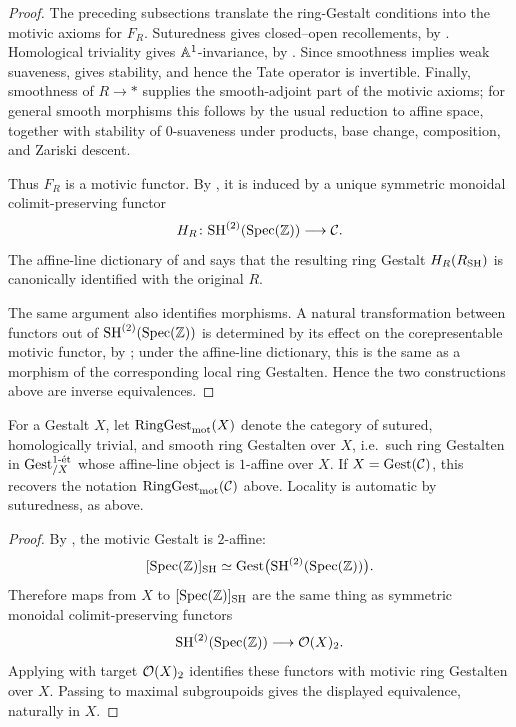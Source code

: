 \documentclass[11pt]{book}
\begin{document}
\begin{proof}
		The preceding subsections translate the ring-Gestalt conditions into the motivic axioms for $F_R$. Suturedness gives closed--open recollements, by . Homological triviality gives $\bbA^1$-invariance, by . Since smoothness implies weak suaveness,  gives stability, and hence the Tate operator is invertible. Finally, smoothness of $R\to*$ supplies the smooth-adjoint part of the motivic axioms; for general smooth morphisms this follows by the usual reduction to affine space, together with stability of \(0\)-suaveness under products, base change, composition, and Zariski descent.

		Thus $F_R$ is a motivic functor. By , it is induced by a unique symmetric monoidal colimit-preserving functor
		\[
			H_R\colon\SH^{(2)}(\Spec(\Z))\longrightarrow\Cc.
		\]
		The affine-line dictionary of  and  says that the resulting ring Gestalt $H_R(R_{\SH})$ is canonically identified with the original $R$.

		The same argument also identifies morphisms. A natural transformation between functors out of $\SH^{(2)}(\Spec(\Z))$ is determined by its effect on the corepresentable motivic functor, by ; under the affine-line dictionary, this is the same as a morphism of the corresponding local ring Gestalten. Hence the two constructions above are inverse equivalences.
	\end{proof}

	For a Gestalt $X$, let $\RingGest_{\mot}(X)$ denote the category of sutured, homologically trivial, and smooth ring Gestalten over $X$, i.e.\ such ring Gestalten in $\Gest^{1\text{-}\et}_{/X}$ whose affine-line object is \(1\)-affine over \(X\). If $X=\Gest(\Cc)$, this recovers the notation $\RingGest_{\mot}(\Cc)$ above. Locality is automatic by suturedness, as above.

	\begin{proof}
		By , the motivic Gestalt is $2$-affine:
		\[
			[\Spec(\Z)]_{\SH}
			\simeq
			\Gest\bigl(\SH^{(2)}(\Spec(\Z))\bigr).
		\]
		Therefore maps from $X$ to $[\Spec(\Z)]_{\SH}$ are the same thing as symmetric monoidal colimit-preserving functors
		\[
			\SH^{(2)}(\Spec(\Z))\longrightarrow\Oo(X)_2.
		\]
		Applying  with target $\Oo(X)_2$ identifies these functors with motivic ring Gestalten over $X$. Passing to maximal subgroupoids gives the displayed equivalence, naturally in $X$.
	\end{proof}
\end{document}
